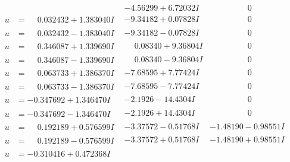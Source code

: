\documentclass[1p]{elsarticle_modified}
\theoremstyle{definition}
\begin{document}
$$\begin{array}{c|c|c}
 & -4.56299 + 6.72032 I & \phantom{-0.000000 } 0 \\ \hline\begin{aligned}
u &= \phantom{-}0.032432 + 1.383040 I\end{aligned}
 & -9.34182 + 0.07828 I & \phantom{-0.000000 } 0 \\ \hline\begin{aligned}
u &= \phantom{-}0.032432 - 1.383040 I\end{aligned}
 & -9.34182 - 0.07828 I & \phantom{-0.000000 } 0 \\ \hline\begin{aligned}
u &= \phantom{-}0.346087 + 1.339690 I\end{aligned}
 & \phantom{-}0.08340 + 9.36804 I & \phantom{-0.000000 } 0 \\ \hline\begin{aligned}
u &= \phantom{-}0.346087 - 1.339690 I\end{aligned}
 & \phantom{-}0.08340 - 9.36804 I & \phantom{-0.000000 } 0 \\ \hline\begin{aligned}
u &= \phantom{-}0.063733 + 1.386370 I\end{aligned}
 & -7.68595 + 7.77424 I & \phantom{-0.000000 } 0 \\ \hline\begin{aligned}
u &= \phantom{-}0.063733 - 1.386370 I\end{aligned}
 & -7.68595 - 7.77424 I & \phantom{-0.000000 } 0 \\ \hline\begin{aligned}
u &= -0.347692 + 1.346470 I\end{aligned}
 & -2.1926 - 14.4304 I & \phantom{-0.000000 } 0 \\ \hline\begin{aligned}
u &= -0.347692 - 1.346470 I\end{aligned}
 & -2.1926 + 14.4304 I & \phantom{-0.000000 } 0 \\ \hline\begin{aligned}
u &= \phantom{-}0.192189 + 0.576599 I\end{aligned}
 & -3.37572 - 0.51768 I & -1.48190 - 0.98551 I \\ \hline\begin{aligned}
u &= \phantom{-}0.192189 - 0.576599 I\end{aligned}
 & -3.37572 + 0.51768 I & -1.48190 + 0.98551 I \\ \hline\begin{aligned}
u &= -0.310416 + 0.472368 I\end{aligned}

\end{array}$$
\end{document}
